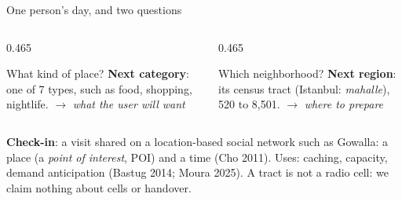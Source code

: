 \documentclass{beamer}
\newcommand{\scite}[1]{{\color{black!60}\footnotesize(#1)}}
\begin{document}
\begin{frame}{One person's day, and two questions}
    \vspace{1mm}
    \begin{columns}[T,onlytextwidth]
        \begin{column}{0.465\textwidth}
            \begin{block}{What kind of place?}
                \footnotesize \textbf{Next category}: one of 7 types, such as food, shopping,
                nightlife. $\to$ \emph{what the user will want}
            \end{block}
        \end{column}
        \hfill
        \begin{column}{0.465\textwidth}
            \begin{block}{Which neighborhood?}
                \footnotesize \textbf{Next region}: its census tract (Istanbul: \emph{mahalle}),
                520 to 8,501. $\to$ \emph{where to prepare}
            \end{block}
        \end{column}
    \end{columns}

    \vspace{0.5mm}
    {\footnotesize\raggedright
    \textbf{Check-in}: a visit shared on a location-based social network such as Gowalla: a place
    (a \emph{point of interest}, POI) and a time \scite{Cho 2011}. Uses: caching, capacity, demand
    anticipation \scite{Bastug 2014; Moura 2025}. A tract is not a radio cell: we claim nothing about
    cells or handover.\par}
\end{frame}
\end{document}
